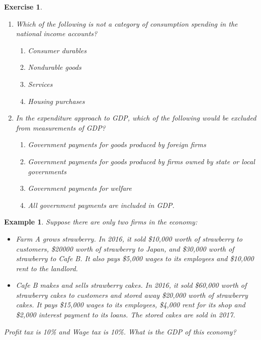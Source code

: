 \documentclass[12pt]{article}
\newtheorem{example}{Example}
\newtheorem{exercise}{Exercise}
\numberwithin{equation}{section}
\begin{document}
\begin{exercise}
    \begin{enumerate}[label=(\arabic*)]
        \item Which of the following is not a category of consumption spending in the national income accounts?
        \begin{enumerate}[label=\Alph*.]
            \item Consumer durables
            \item Nondurable goods
            \item Services
            \item Housing purchases
        \end{enumerate}
        \item In the expenditure approach to GDP, which of the following would be excluded from measurements of GDP?
        \begin{enumerate}[label=\Alph*.]
            \item Government payments for goods produced by foreign firms
            \item Government payments for goods produced by firms owned by state or local governments
            \item Government payments for welfare 
            \item All government payments are included in GDP.
        \end{enumerate}
    \end{enumerate}
\end{exercise}


\begin{example}
    Suppose there are only two firms in the economy:
    \begin{itemize}
        \item Farm A grows strawberry. In 2016, it sold \$10,000 worth of strawberry to customers, \$20000 worth of strawberry to Japan, and \$30,000 worth of strawberry to Cafe B. It also pays \$5,000 wages to its employees and \$10,000 rent to the landlord.
        \item Cafe B makes and sells strawberry cakes. In 2016, it sold \$60,000 worth of strawberry cakes to customers and stored away \$20,000 worth of strawberry cakes. It pays \$15,000 wages to its employees, \$4,000 rent for its shop and \$2,000 interest payment to its loans. The stored cakes are sold in 2017.
    \end{itemize}
    Profit tax is 10\% and Wage tax is 10\%. What is the GDP of this economy?
\end{example}
\end{document}
